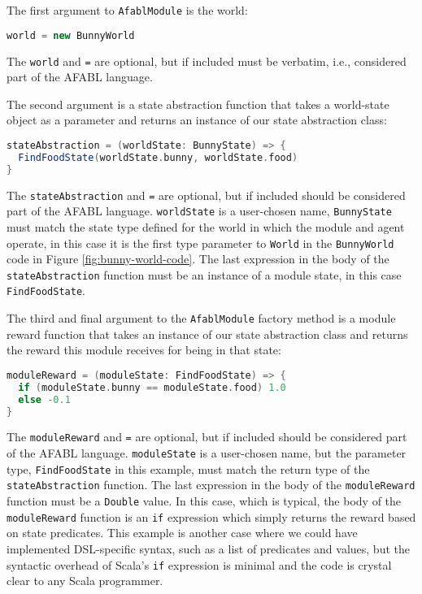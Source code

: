 The first argument to {\tt AfablModule} is the world:

\begin{center}
\begin{lstlisting}[language=Scala,frame=none]
world = new BunnyWorld
\end{lstlisting}
\end{center}

The {\tt world} and {\tt =} are optional, but if included must be verbatim, i.e., considered part of the AFABL language.

The second argument is a state abstraction function that takes a world-state object as a parameter and returns an instance of our state abstraction class:

\begin{center}
\begin{lstlisting}[language=Scala,frame=none]
stateAbstraction = (worldState: BunnyState) => {
  FindFoodState(worldState.bunny, worldState.food)
}
\end{lstlisting}
\end{center}

The {\tt stateAbstraction} and {\tt =} are optional, but if included should be considered part of the AFABL language. {\tt worldState} is a user-chosen name, {\tt BunnyState} must match the state type defined for the world in which the module and agent operate, in this case it is the first type parameter to {\tt World} in the {\tt BunnyWorld} code in Figure \ref{fig:bunny-world-code}. The last expression in the body of the {\tt stateAbstraction} function must be an instance of a module state, in this case {\tt FindFoodState}.

The third and final argument to the {\tt AfablModule} factory method is a module reward function that takes an instance of our state abstraction class and returns the reward this module receives for being in that state:

\begin{center}
\begin{lstlisting}[language=Scala,frame=none]
moduleReward = (moduleState: FindFoodState) => {
  if (moduleState.bunny == moduleState.food) 1.0
  else -0.1
}
\end{lstlisting}
\end{center}

The {\tt moduleReward} and {\tt =} are optional, but if included should be considered part of the AFABL language. {\tt moduleState} is a user-chosen name, but the parameter type, {\tt FindFoodState} in this example, must match the return type of the {\tt stateAbstraction} function. The last expression in the body of the {\tt moduleReward} function must be a {\tt Double} value. In this case, which is typical, the body of the {\tt moduleReward} function is an {\tt if} expression which simply returns the reward based on state predicates. This example is another case where we could have implemented DSL-specific syntax, such as a list of predicates and values, but the syntactic overhead of Scala's {\tt if} expression is minimal and the code is crystal clear to any Scala programmer.

